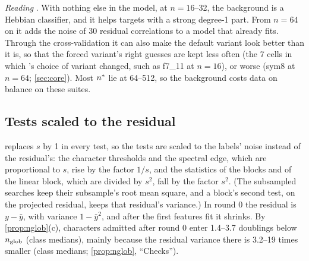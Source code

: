 \emph{Reading} . With nothing else in the model, at $n=16$--32, the background is a Hebbian classifier, and it helps targets with a strong degree-1 part. From $n=64$ on it adds the noise of 30 residual correlations to a model that already fits. Through the cross-validation it can also make the default variant look better than it is, so that the forced variant's right guesses are kept less often (the 7 cells in which 's choice of variant changed, such as f7\_11 at $n=16$), or worse (sym8 at $n=64$; \cref{sec:core}). Most $n^{*}$ lie at 64--512, so the background costs data on balance on these suites.

\subsection{Tests scaled to the residual}\label{sec:abl-label}

 replaces $s$ by 1 in every test, so the tests are scaled to the labels' noise instead of the residual's: the character thresholds and the spectral edge, which are proportional to $s$, rise by the factor $1/s$, and the statistics of the blocks and of the linear block, which are divided by $s^2$, fall by the factor $s^2$. (The subsampled searches keep their subsample's root mean square, and a block's second test, on the projected residual, keeps that residual's variance.) In round 0 the residual is $y-\bar y$, with variance $1-\bar y^2$, and after the first features fit it shrinks. By \cref{prop:nglob}(c), characters admitted after round 0 enter 1.4--3.7 doublings below $n_{\rm glob}$ (class medians), mainly because the residual variance there is 3.2--19 times smaller (class medians; \cref{prop:nglob}, ``Checks'').

